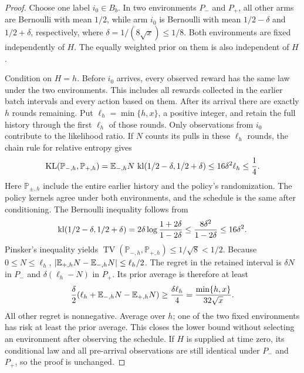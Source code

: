 \begin{proof}
Choose one label $i_0\in B_b$. In two environments $P_-$ and $P_+$,
all other arms are Bernoulli with mean $1/2$, while arm $i_0$ is
Bernoulli with mean $1/2-\delta$ and $1/2+\delta$, respectively, where
$\delta=1/(8\sqrt x)\le1/8$. Both environments are fixed independently
of $H$. The equally weighted prior on them is also independent of $H$.

Condition on $H=h$. Before $i_0$ arrives, every observed reward has
the same law under the two environments. This includes all rewards
collected in the earlier batch intervals and every action based on
them. After its arrival there are exactly $h$ rounds remaining. Put
$\ell_h=\min\{h,x\}$, a positive integer, and retain the full history
through the first $\ell_h$ of those rounds. Only observations from
$i_0$ contribute to the likelihood ratio. If $N$ counts its pulls in
these $\ell_h$ rounds, the chain rule for relative entropy gives
\[
 \operatorname{KL}(\mathbb P_{-,h},\mathbb P_{+,h})
 =\mathbb E_{-,h}N\,
    \operatorname{kl}(1/2-\delta,1/2+\delta)
 \le16\delta^2\ell_h\le\frac14.
\]
Here $\mathbb P_{\pm,h}$ include the entire earlier history and the
policy's randomization. The policy kernels agree under both
environments, and the schedule is the same after conditioning.
The Bernoulli inequality follows from
\[
 \operatorname{kl}(1/2-\delta,1/2+\delta)
 =2\delta\log\frac{1+2\delta}{1-2\delta}
 \le\frac{8\delta^2}{1-2\delta}\le16\delta^2.
\]
Pinsker's inequality yields
$\operatorname{TV}(\mathbb P_{-,h},\mathbb P_{+,h})\le1/\sqrt8<1/2$.
Because $0\le N\le\ell_h$,
$|\mathbb E_{+,h}N-\mathbb E_{-,h}N|\le\ell_h/2$. The regret in the retained
interval is $\delta N$ in $P_-$ and $\delta(\ell_h-N)$ in $P_+$.
Its prior average is therefore at least
\[
 \frac\delta2
       (\ell_h+\mathbb E_{-,h}N-\mathbb E_{+,h}N)
 \ge\frac{\delta\ell_h}{4}
 =\frac{\min\{h,x\}}{32\sqrt x}.
\]
All other regret is nonnegative. Average over $h$; one of the two
fixed environments has risk at least the prior average. This closes
the lower bound without selecting an environment after observing the
schedule. If $H$ is supplied at time zero, its conditional law and
all pre-arrival observations are still identical under $P_-$ and
$P_+$, so the proof is unchanged.
\end{proof}

